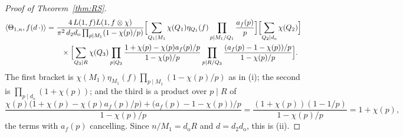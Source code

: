 ﻿\documentclass[11pt]{amsart}
\theoremstyle{remark}
\begin{document}
\begin{proof}[Proof of Theorem~\ref{thm:RS}]
\begin{align*}
\langle\Theta_{1,n},f(d\,\cdot)\rangle&=\frac{4\,L(1,f)L(1,f\otimes\chi)}{\pi^2\,d_2d_{\mathrm{o}}\prod_{p\mid M_1}(1-\chi(p)/p)}
\Bigl[\sum_{Q_1\mid M_1}\chi(Q_1)\eta_{Q_1}(f)\prod_{p\mid M_1/Q_1}\frac{a_f(p)}p\Bigr]
\Bigl[\sum_{Q_2\mid d_{\mathrm{o}}}\chi(Q_2)\Bigr]\\
&\qquad\times\Bigl[\sum_{Q_3\mid R}\chi(Q_3)\prod_{p\mid Q_3}\frac{1+\chi(p)-\chi(p)a_f(p)/p}{1-\chi(p)/p}\prod_{p\mid R/Q_3}\frac{(a_f(p)-1-\chi(p))/p}{1-\chi(p)/p}\Bigr].
\end{align*}
The first bracket is $\chi(M_1)\eta_{M_1}(f)\prod_{p\mid M_1}(1-\chi(p)/p)$ as in (i); the second is $\prod_{p\mid d_{\mathrm{o}}}(1+\chi(p))$; and the third is a product over $p\mid R$ of
\[
\frac{\chi(p)\bigl(1+\chi(p)-\chi(p)a_f(p)/p\bigr)+\bigl(a_f(p)-1-\chi(p)\bigr)/p}{1-\chi(p)/p}=\frac{(1+\chi(p))(1-1/p)}{1-\chi(p)/p}=1+\chi(p),
\]
the terms with $a_f(p)$ cancelling. Since $n/M_1=d_{\mathrm{o}}R$ and $d=d_2d_{\mathrm{o}}$, this is (ii).
\end{proof}
\end{document}
